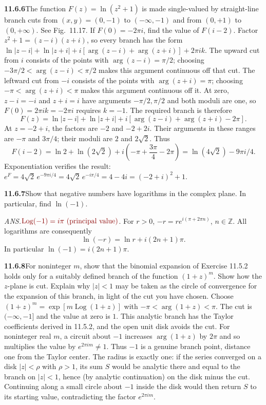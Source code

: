 \par\bigskip
\noindent\textbf{11.6.6}\quad The function $F(z)=\ln(z^{2}+1)$ is made
single-valued by straight-line branch cuts from $(x,y)=(0,-1)$ to
$(-\infty,-1)$ and from $(0,+1)$ to $(0,+\infty)$. See Fig.~11.17. If
$F(0)=-2\pi i$, find the value of $F(i-2)$.
\solution
Factor $z^2+1=(z-i)(z+i)$, so every branch has the form
$\ln|z-i|+\ln|z+i|+i[\arg(z-i)+\arg(z+i)]+2\pi ik$.
The upward cut from $i$ consists of the points with
$\arg(z-i)=\pi/2$; choosing $-3\pi/2<\arg(z-i)<\pi/2$ makes this
argument continuous off that cut. The leftward cut from $-i$ consists
of the points with $\arg(z+i)=\pi$; choosing $-\pi<\arg(z+i)<\pi$
makes this argument continuous off it.
At zero, $z-i=-i$ and $z+i=i$ have arguments $-\pi/2,\pi/2$ and both
moduli are one, so $F(0)=2\pi ik=-2\pi i$ requires $k=-1$.
The required branch is therefore
\[
F(z)=\ln|z-i|+\ln|z+i|
+i[\arg(z-i)+\arg(z+i)-2\pi].
\]
At $z=-2+i$, the factors are $-2$ and $-2+2i$.
Their arguments in these ranges are $-\pi$ and $3\pi/4$;
their moduli are $2$ and $2\sqrt2$. Thus
\[
F(i-2)=\ln2+\ln(2\sqrt2)+i\left(-\pi+\frac{3\pi}4-2\pi\right)
=\boxed{\ln(4\sqrt2)-9\pi i/4}.
\]
Exponentiation verifies the result:
$e^F=4\sqrt2\,e^{-9\pi i/4}=4\sqrt2\,e^{-i\pi/4}=4-4i=(-2+i)^2+1$.

\par\bigskip
\noindent\textbf{11.6.7}\quad Show that negative numbers have logarithms in
the complex plane. In particular, find $\ln(-1)$.
\par\nobreak\hfill\emph{ANS.}\enspace $\erratum{\operatorname{Log}(-1)=i\pi\text{ (principal value)}}$.
\solution
For $r>0$, $-r=re^{i(\pi+2\pi n)}$, $n\in\mathbb Z$.
All logarithms are consequently
\[
\boxed{\ln(-r)=\ln r+i(2n+1)\pi}.
\]
In particular $\ln(-1)=i(2n+1)\pi$.

\par\bigskip
\noindent\textbf{11.6.8}\quad For noninteger $m$, show that the binomial
expansion of Exercise 11.5.2 holds only for a suitably defined branch of the
function $(1+z)^{m}$. Show how the $z$-plane is cut. Explain why $|z| < 1$
may be taken as the circle of convergence for the expansion of this branch,
in light of the cut you have chosen.
\solution
Choose $(1+z)^m=\exp[m\operatorname{Log}(1+z)]$ with
$-\pi<\arg(1+z)<\pi$. The cut is $(-\infty,-1]$ and the
value at zero is $1$. This analytic branch has the Taylor
coefficients derived in 11.5.2, and the open unit disk avoids the cut.
For noninteger real $m$, a circuit about $-1$ increases $\arg(1+z)$ by
$2\pi$ and so multiplies the value by $e^{2\pi im}\ne1$. Thus $-1$ is a
genuine branch point, distance one from the Taylor center. The radius
is exactly one: if the series converged on a disk $|z|<\rho$ with
$\rho>1$, its sum $S$ would be analytic there and equal to the branch
on $|z|<1$, hence (by analytic continuation) on the disk minus the
cut. Continuing along a small circle about $-1$ inside the disk would
then return $S$ to its starting value, contradicting the factor
$e^{2\pi im}$.

